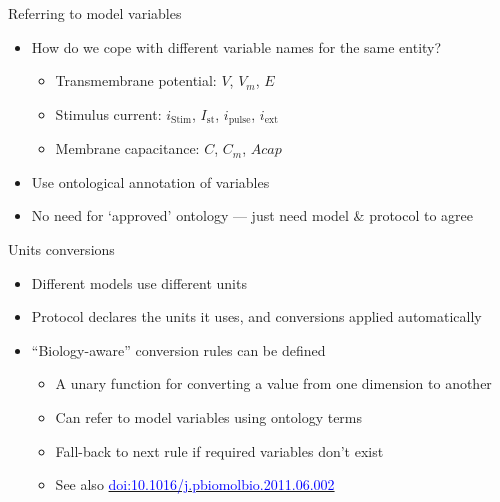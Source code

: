\documentclass[t,xcolor={usenames,dvipsnames}]{beamer}
\newcommand{\myhref}[2]{\href{#1}{\textcolor{Blue}{#2}}}
\newcommand{\doi}[1]{\myhref{http://dx.doi.org/#1}{doi:#1}}
\begin{document}
\begin{frame}{Referring to model variables}
\begin{itemize}
\item How do we cope with different variable names for the same entity?
  \begin{itemize}
  \item Transmembrane potential: $V$, $V_m$, $E$
  \item Stimulus current: $i_{\mathrm{Stim}}$, $I_{\mathrm{st}}$, $i_{\mathrm{pulse}}$, $i_{\mathrm{ext}}$
  \item Membrane capacitance: $C$, $C_m$, $\mathit{Acap}$
  \end{itemize}
\item Use \alert{ontological annotation} of variables
\item No need for `approved' ontology --- just need model \& protocol to agree
\end{itemize}
\end{frame}

\begin{frame}{Units conversions}
\begin{itemize}
\item Different models use different units
\item Protocol declares the units it uses, and conversions applied automatically
\item ``Biology-aware'' conversion rules can be defined
  \begin{itemize}
  \item A unary function for converting a value from one dimension to another
  \item Can refer to model variables using ontology terms
  \item Fall-back to next rule if required variables don't exist
  \item See also \doi{10.1016/j.pbiomolbio.2011.06.002}
  \end{itemize}
\end{itemize}
\end{frame}
\end{document}
